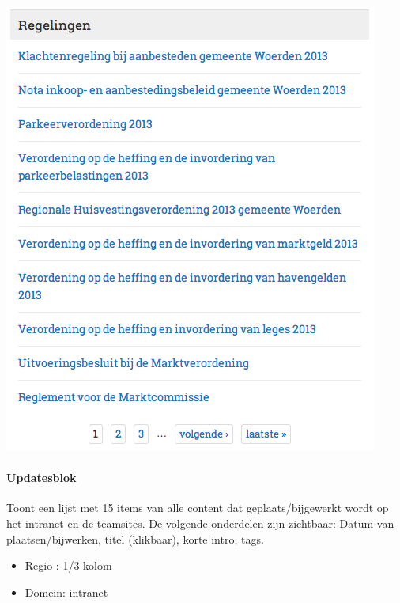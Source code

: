 \begin{center}
	\includegraphics[scale=0.5]{img/blokken/regelingen.png}
\end{center}

\paragraph{Updatesblok}

Toont een lijst met 15 items van alle content dat geplaats/bijgewerkt wordt op het intranet en de teamsites. De volgende onderdelen zijn zichtbaar: Datum van plaatsen/bijwerken, titel (klikbaar), korte intro, tags.

\begin{itemize}
\item Regio : 1/3 kolom
\item Domein: intranet
\end{itemize}

